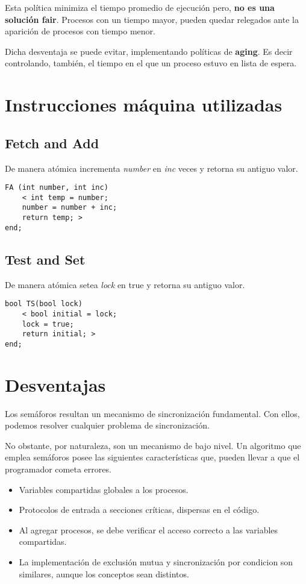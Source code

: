 \documentclass[a4paper, 10pt]{report}
\begin{document}
Esta política minimiza el tiempo promedio de ejecución pero, \textbf{no es una solución fair}. Procesos con un tiempo mayor, pueden quedar relegados ante la aparición de procesos con tiempo menor. 

Dicha desventaja se puede evitar, implementando políticas de \textbf{aging}. Es decir controlando, también, el tiempo en el que un proceso estuvo en lista de espera.

\section{Instrucciones máquina utilizadas}

\subsection{Fetch and Add}
De manera atómica incrementa \emph{number} en \emph{inc} veces y retorna su antiguo valor.

\begin{lstlisting}
FA (int number, int inc)
	< int temp = number;
	number = number + inc;
	return temp; >
end;
\end{lstlisting}

\subsection{Test and Set}

De manera atómica setea \emph{lock} en true y retorna su antiguo valor.

\begin{lstlisting}
bool TS(bool lock)
	< bool initial = lock; 
	lock = true; 
	return initial; >
end;
\end{lstlisting}

\section{Desventajas}

Los semáforos resultan un mecanismo de sincronización fundamental. Con ellos, podemos resolver cualquier problema de sincronización.

No obstante, por naturaleza, son un mecanismo de bajo nivel. Un algoritmo que emplea semáforos posee las siguientes características que, pueden llevar a que el programador cometa errores.

\begin{itemize}
	\item Variables compartidas globales a los procesos.
	\item Protocolos de entrada a secciones críticas, dispersas en el código.
	\item Al agregar procesos, se debe verificar el acceso correcto a las variables compartidas.
	\item La implementación de exclusión mutua y sincronización por condicion son similares, aunque los conceptos sean distintos.
\end{itemize}
\end{document}
